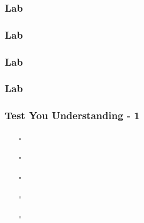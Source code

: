 \documentclass[t, notes, xcolor=table]{beamer}
\begin{document}
\begin{frame}
\frametitle{Lab}

\end{frame}
\note{
\scriptsize{

}
}

\begin{frame}
\frametitle{Lab}

\end{frame}
\note{
\scriptsize{

}
}

\begin{frame}
\frametitle{Lab}

\end{frame}
\note{
\scriptsize{

}
}

\begin{frame}
\frametitle{Lab}

\end{frame}
\note{
\scriptsize{

}
}



\begin{frame}
\frametitle{Test You Understanding - 1}

\begin{itemize}
\item[$\square$] 
\item[$\square$] 
\item[$\square$] 
\item[$\square$] 
\item[$\square$] 
\end{itemize}
\end{frame}
\note{
\scriptsize{

}
}
\end{document}

